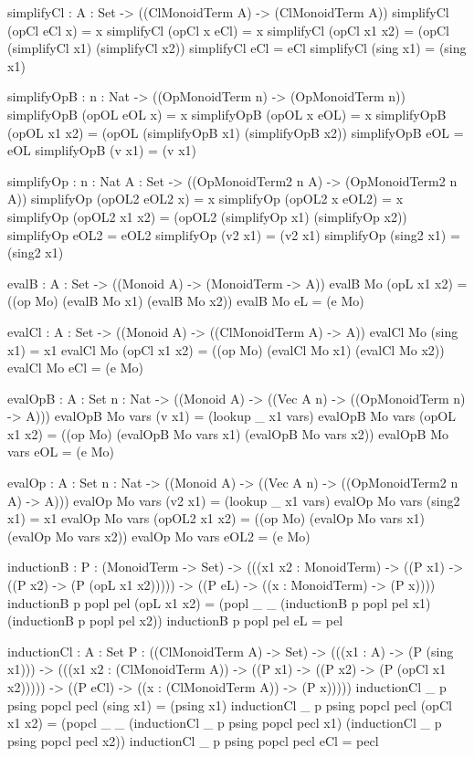 \begin{togcode}  
  simplifyCl : {A : Set} -> ((ClMonoidTerm A) -> (ClMonoidTerm A))
  simplifyCl (opCl eCl x) = x 
  simplifyCl (opCl x eCl) = x 
  simplifyCl (opCl x1 x2) = (opCl (simplifyCl x1) (simplifyCl x2)) 
  simplifyCl eCl = eCl 
  simplifyCl (sing x1) = (sing x1) 
    
  simplifyOpB : {n : Nat} -> ((OpMonoidTerm n) -> (OpMonoidTerm n))
  simplifyOpB (opOL eOL x) = x 
  simplifyOpB (opOL x eOL) = x 
  simplifyOpB (opOL x1 x2) = (opOL (simplifyOpB x1) (simplifyOpB x2)) 
  simplifyOpB eOL = eOL 
  simplifyOpB (v x1) = (v x1) 

  simplifyOp : {n : Nat} {A : Set} -> 
      ((OpMonoidTerm2 n A) -> (OpMonoidTerm2 n A))
  simplifyOp (opOL2 eOL2 x) = x 
  simplifyOp (opOL2 x eOL2) = x 
  simplifyOp (opOL2 x1 x2) = (opOL2 (simplifyOp x1) (simplifyOp x2)) 
  simplifyOp eOL2 = eOL2 
  simplifyOp (v2 x1) = (v2 x1) 
  simplifyOp (sing2 x1) = (sing2 x1) 
\end{togcode}
\begin{togcode}  
  evalB : {A : Set} -> ((Monoid A) -> (MonoidTerm -> A))
  evalB Mo (opL x1 x2) = ((op Mo) (evalB Mo x1) (evalB Mo x2)) 
  evalB Mo eL = (e Mo) 
  
  evalCl : {A : Set} -> ((Monoid A) -> ((ClMonoidTerm A) -> A))
  evalCl Mo (sing x1) = x1 
  evalCl Mo (opCl x1 x2) = ((op Mo) (evalCl Mo x1) (evalCl Mo x2)) 
  evalCl Mo eCl = (e Mo) 
  
  evalOpB : {A : Set} {n : Nat} -> 
      ((Monoid A) -> ((Vec A n) -> ((OpMonoidTerm n) -> A)))
  evalOpB Mo vars (v x1) = (lookup _ x1 vars) 
  evalOpB Mo vars (opOL x1 x2) = 
    ((op Mo) (evalOpB Mo vars x1) (evalOpB Mo vars x2)) 
  evalOpB Mo vars eOL = (e Mo) 

  evalOp : {A : Set} {n : Nat} -> 
      ((Monoid A) -> ((Vec A n) -> ((OpMonoidTerm2 n A) -> A)))
  evalOp Mo vars (v2 x1) = (lookup _ x1 vars) 
  evalOp Mo vars (sing2 x1) = x1 
  evalOp Mo vars (opOL2 x1 x2) = 
    ((op Mo) (evalOp Mo vars x1) (evalOp Mo vars x2)) 
  evalOp Mo vars eOL2 = (e Mo) 
\end{togcode}                  
\begin{togcode}  
  inductionB : {P : (MonoidTerm -> Set)} -> 
    (((x1 x2 : MonoidTerm) -> ((P x1) -> ((P x2) -> (P (opL x1 x2))))) -> 
    ((P eL) -> ((x : MonoidTerm) -> (P x))))
  inductionB {p} popl pel (opL x1 x2) = 
    (popl _ _ (inductionB {p} popl pel x1) (inductionB {p} popl pel x2)) 
  inductionB {p} popl pel eL = pel 

  inductionCl : {A : Set} {P : ((ClMonoidTerm A) -> Set)} -> 
    (((x1 : A) -> (P (sing x1))) -> 
    (((x1 x2 : (ClMonoidTerm A)) -> 
      ((P x1) -> ((P x2) -> (P (opCl x1 x2))))) -> 
    ((P eCl) -> ((x : (ClMonoidTerm A)) -> (P x)))))
  inductionCl {_} {p} psing popcl pecl (sing x1) = (psing x1) 
  inductionCl {_} {p} psing popcl pecl (opCl x1 x2) = 
    (popcl _ _ (inductionCl {_} {p} psing popcl pecl x1) 
               (inductionCl {_} {p} psing popcl pecl x2)) 
  inductionCl {_} {p} psing popcl pecl eCl = pecl 
\end{togcode} 
